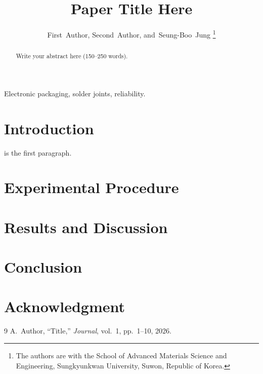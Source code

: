 \documentclass[journal]{IEEEtran}
\begin{document}
\title{Paper Title Here}

\author{First~Author,
        Second~Author,
        and~Seung-Boo~Jung%
\thanks{The authors are with the School of Advanced Materials Science and
Engineering, Sungkyunkwan University, Suwon, Republic of Korea.}}

\maketitle

\begin{abstract}
Write your abstract here (150--250 words).
\end{abstract}

\begin{IEEEkeywords}
Electronic packaging, solder joints, reliability.
\end{IEEEkeywords}

\section{Introduction}
 is the first paragraph.

\section{Experimental Procedure}

\section{Results and Discussion}

\section{Conclusion}

\section*{Acknowledgment}

\begin{thebibliography}{9}
 A.~Author, ``Title,'' \emph{Journal}, vol.~1, pp.~1--10, 2026.
\end{thebibliography}
\end{document}
